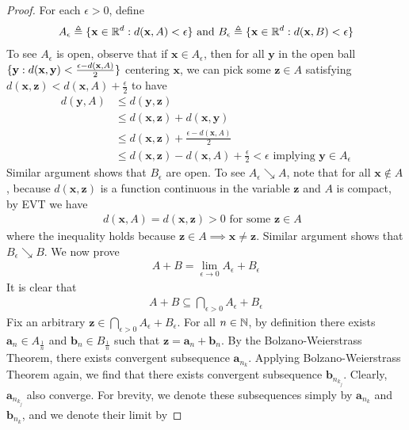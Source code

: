 \documentclass{report}
\begin{document}
\begin{proof}
For each $\epsilon >0$, define 
\begin{align*}
A_{\epsilon }\triangleq \{ \textbf{x}\in\mathbb{R}^d: d(\textbf{x},A)<\epsilon  \}\text{ and }B_{\epsilon }\triangleq \{ \textbf{x}\in\mathbb{R}^d: d(\textbf{x},B)<\epsilon  \}
\end{align*}
To see $A_\epsilon $ is open, observe that if $\textbf{x}\in A_{\epsilon }$, then for all $\textbf{y}$ in the open ball $\{ \textbf{y}:d(\textbf{x},\textbf{y})<\frac{\epsilon -d(\textbf{x},A)}{2} \}$ centering $\textbf{x}$, we can pick some $\textbf{z} \in A$ satisfying $d(\textbf{x},\textbf{z})< d(\textbf{x},A) + \frac{\epsilon}{2}$ to have
\begin{align*}
  d(\textbf{y},A)&\leq d(\textbf{y},\textbf{z})\\
  &\leq d(\textbf{x},\textbf{z})+d(\textbf{x},\textbf{y})\\
  &\leq d(\textbf{x},\textbf{z})+ \frac{\epsilon -d(\textbf{x},A)}{2}\\
  &\leq d(\textbf{x},\textbf{z})-d(\textbf{x},A)+ \frac{\epsilon }{2}<\epsilon \text{ implying }\textbf{y} \in A_\epsilon 
\end{align*}
Similar argument shows that $B_{\epsilon }$ are open. To see $A_\epsilon \searrow A$, note that for all $\textbf{x}\not\in A$, because $d(\textbf{x},\textbf{z})$ is a function continuous in the variable $\textbf{z}$ and $A$ is compact, by EVT we have 
 \begin{align*}
d(\textbf{x},A)=d(\textbf{x},\textbf{z})>0\text{ for some $\textbf{z}\in A$ }
\end{align*}
where the inequality holds because $\textbf{z}\in A \implies \textbf{x}\neq \textbf{z} $. Similar argument shows that $B_\epsilon \searrow B$. We now prove 
\begin{align}
\label{A+B}
A+B= \lim_{\epsilon \to 0} A_\epsilon +B_ \epsilon 
\end{align}
It is clear that 
\begin{align}
\label{a+b}
A+B\subseteq \bigcap_{\epsilon >0}A_\epsilon +B_\epsilon 
\end{align}
Fix an arbitrary $\textbf{z}\in \bigcap_{\epsilon >0}A_\epsilon +B_\epsilon $. For all $n\in\mathbb{N}$, by definition there exists $\textbf{a}_n \in A_{\frac{1}{n}} $ and $\textbf{b}_n \in B_{\frac{1}{n}} $ such that $\textbf{z}=\textbf{a}_n+\textbf{b}_n$. By the Bolzano-Weierstrass Theorem, there exists convergent subsequence $\textbf{a}_{n_k}$. Applying Bolzano-Weierstrass Theorem again, we find that there exists convergent subsequence $\textbf{b}_{n_{k_j}}$. Clearly, $\textbf{a}_{n_{k_j}}$ also converge. For brevity, we denote these subsequences simply by $\textbf{a}_{n_k}$ and $\textbf{b}_{n_k}$, and we denote their limit by 

\end{proof}
\end{document}
